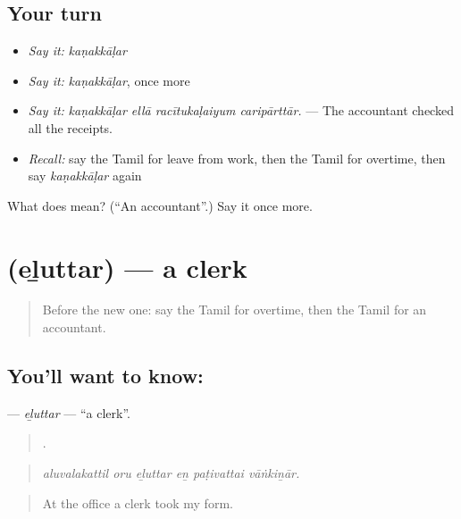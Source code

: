 \subsection*{Your turn}
\begin{itemize}
\raggedright
  \item \emph{Say it:} \emph{kaṇakkāḷar}
  \item \emph{Say it:} \emph{kaṇakkāḷar}, once more
  \item \emph{Say it:} \emph{kaṇakkāḷar ellā racītukaḷaiyum caripārttār.} — The accountant checked all the receipts.
  \item \emph{Recall:} say the Tamil for leave from work, then the Tamil for overtime, then say \emph{kaṇakkāḷar} again
\end{itemize}

\begin{tcolorbox}[breakable,colback=teal!4,colframe=teal!35!black,title={Before you move on}]
What does  mean? (\textquotedblleft{}An accountant\textquotedblright{}.) Say it once more.
\end{tcolorbox}
\section[\texorpdfstring{\ta{எழுத்தர்} (eḻuttar)}{எழுத்தர் (eḻuttar)}]{ (eḻuttar) — a clerk}

\label{lesson:TA-C508-eluttar}



\begin{quote}
Before the new one: say the Tamil for overtime, then the Tamil for an accountant.
\end{quote}

\subsection*{You'll want to know: }
\textbf{} — \emph{eḻuttar} — \textquotedblleft{}a clerk\textquotedblright{}.

\begin{quote}
     .
\end{quote}

\begin{quote}
\emph{aluvalakattil oru eḻuttar eṉ paṭivattai vāṅkiṉār.}
\end{quote}

\begin{quote}
At the office a clerk took my form.
\end{quote}

